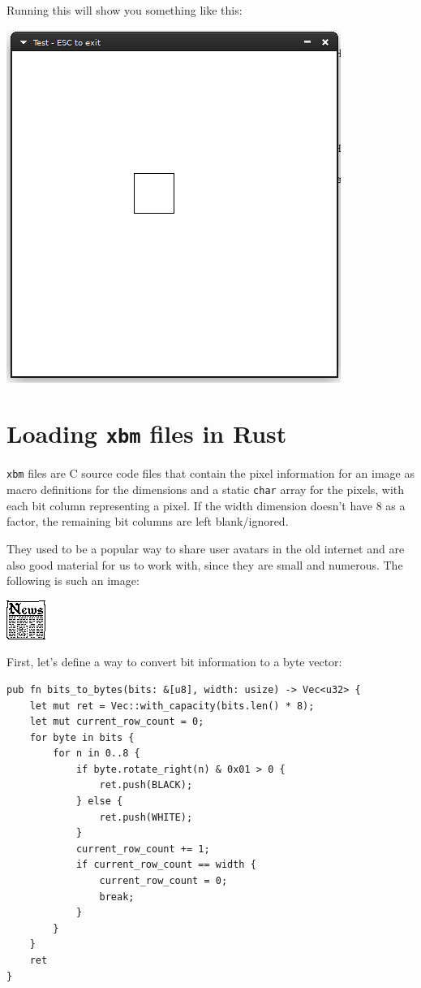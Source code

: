 \documentclass[12pt,a4,oneside,usenames,dvipsnames]{book}
\begin{document}
Running this will show you something like this:

\includegraphics{figures/introduction.png}

\section{Loading \texttt{xbm} files in Rust}

\texttt{xbm} files are C source code files that contain the pixel information for an image as macro definitions for the dimensions and a static \texttt{char} array for the pixels, with each bit column representing a pixel. If the width dimension doesn't have 8 as a factor, the remaining bit columns are left blank/ignored.

They used to be a popular way to share user avatars in the old internet and are also good material for us to work with, since they are small and numerous. The following is such an image:

\begin{center}
\includegraphics{figures/news.png}
\end{center}

First, let's define a way to convert bit information to a byte vector:

\begin{verbatim}
pub fn bits_to_bytes(bits: &[u8], width: usize) -> Vec<u32> {
    let mut ret = Vec::with_capacity(bits.len() * 8);
    let mut current_row_count = 0;
    for byte in bits {
        for n in 0..8 {
            if byte.rotate_right(n) & 0x01 > 0 {
                ret.push(BLACK);
            } else {
                ret.push(WHITE);
            }
            current_row_count += 1;
            if current_row_count == width {
                current_row_count = 0;
                break;
            }
        }
    }
    ret
}
\end{verbatim}
\end{document}
